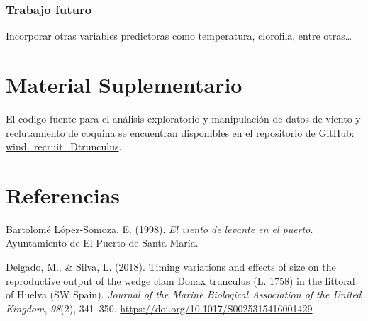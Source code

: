 \documentclass[
]{article}
\newlength{\cslhangindent}
\newenvironment{CSLReferences}[2] %
 {\begin{list}{}{%
  \setlength{\itemindent}{0pt}
  \setlength{\leftmargin}{0pt}
  \setlength{\parsep}{0pt}
  \ifodd #1
   \setlength{\leftmargin}{\cslhangindent}
   \setlength{\itemindent}{-1\cslhangindent}
  \fi
  \setlength{\itemsep}{#2\baselineskip}}}
 {\end{list}}
\begin{document}
\subsubsection{Trabajo futuro}\label{trabajo-futuro}

Incorporar otras variables predictoras como temperatura, clorofila, entre otras\ldots{}

\newpage

\section{Material Suplementario}\label{material-suplementario}

El codigo fuente para el análisis exploratorio y manipulación de datos de viento y reclutamiento de coquina se encuentran disponibles en el repositorio de GitHub: \href{https://github.com/MauroMardones/wind-recruitment-Dtrunculus}{wind\_recruit\_Dtrunculus}.

\newpage

\section*{Referencias}\label{referencias}

\label{refs}
\begin{CSLReferences}{1}{0}
Bartolomé López-Somoza, E. (1998). \emph{El viento de levante en el puerto}. Ayuntamiento de El Puerto de Santa María.

Delgado, M., \& Silva, L. (2018). {Timing variations and effects of size on the reproductive output of the wedge clam Donax trunculus (L. 1758) in the littoral of Huelva (SW Spain)}. \emph{Journal of the Marine Biological Association of the United Kingdom}, \emph{98}(2), 341--350. \url{https://doi.org/10.1017/S0025315416001429}

\end{CSLReferences}
\end{document}
